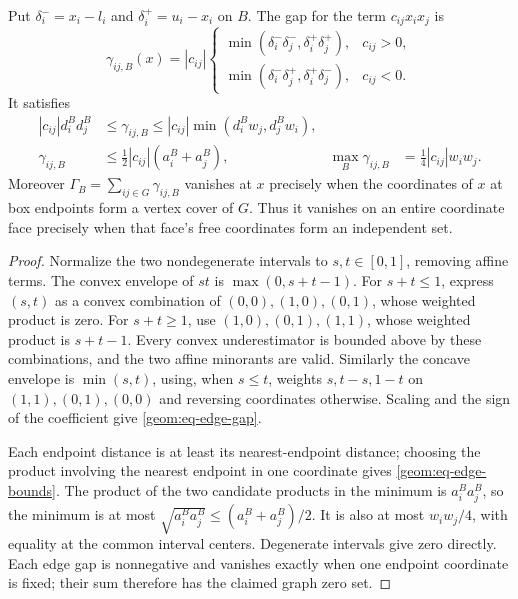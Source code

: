 \begin{lemma}\label{geom:lem-mcc-gap}
Put $\delta_i^-=x_i-l_i$ and $\delta_i^+=u_i-x_i$ on $B$. The gap for
the term $c_{ij}x_ix_j$ is
\begin{equation}\label{geom:eq-edge-gap}
 \gamma_{ij,B}(x)=|c_{ij}|\begin{cases}
 \min(\delta_i^-\delta_j^-,\delta_i^+\delta_j^+),&c_{ij}>0,\\
 \min(\delta_i^-\delta_j^+,\delta_i^+\delta_j^-),&c_{ij}<0.
 \end{cases}
\end{equation}
It satisfies
\begin{align}
 |c_{ij}|d_i^B d_j^B&\leq\gamma_{ij,B}
       \leq |c_{ij}|\min(d_i^Bw_j,d_j^Bw_i),\label{geom:eq-edge-bounds}\\
 \gamma_{ij,B}&\leq\tfrac12|c_{ij}|(a_i^B+a_j^B),&
 \max_B\gamma_{ij,B}&=\tfrac14|c_{ij}|w_iw_j.\label{geom:eq-edge-upper}
\end{align}
Moreover $\Gamma_B=\sum_{ij\in G}\gamma_{ij,B}$ vanishes at $x$
precisely when the coordinates of $x$ at box endpoints form a vertex
cover of $G$. Thus it vanishes on an entire coordinate face precisely
when that face's free coordinates form an independent set.
\end{lemma}
\begin{proof}
Normalize the two nondegenerate intervals to $s,t\in[0,1]$, removing
affine terms. The convex envelope of $st$ is $\max(0,s+t-1)$.
For $s+t\leq1$, express $(s,t)$ as a convex combination of
$(0,0),(1,0),(0,1)$, whose weighted product is zero. For $s+t\geq1$,
use $(1,0),(0,1),(1,1)$, whose weighted product is $s+t-1$.
Every convex underestimator is bounded above by these combinations,
and the two affine minorants are valid. Similarly the concave envelope
is $\min(s,t)$, using, when $s\leq t$, weights $s,t-s,1-t$ on
$(1,1),(0,1),(0,0)$ and reversing coordinates otherwise. Scaling and
the sign of the coefficient give \cref{geom:eq-edge-gap}.

Each endpoint distance is at least its nearest-endpoint distance;
choosing the product involving the nearest endpoint in one coordinate
gives \cref{geom:eq-edge-bounds}. The product of the two candidate
products in the minimum is $a_i^Ba_j^B$, so the minimum is at most
$\sqrt{a_i^Ba_j^B}\leq(a_i^B+a_j^B)/2$. It is also at most
$w_iw_j/4$, with equality at the common interval centers.
Degenerate intervals give zero directly. Each edge gap is nonnegative
and vanishes exactly when one endpoint coordinate is fixed; their sum
therefore has the claimed graph zero set.
\end{proof}

